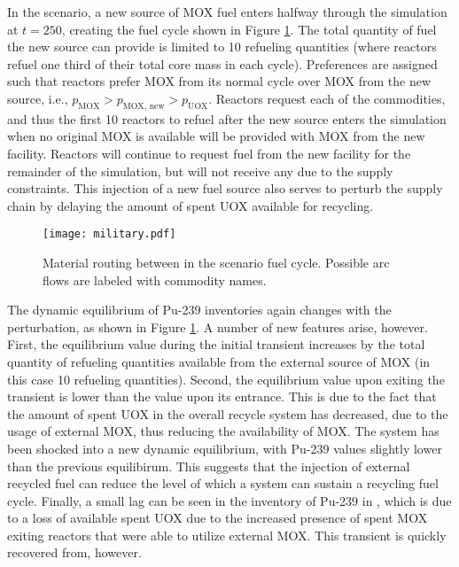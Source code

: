 In the \external scenario, a new source of MOX fuel enters halfway
through the simulation at $t = 250$, creating the fuel cycle shown in Figure
\ref{fig:military}. The total quantity of fuel the new source can provide is
limited to 10 refueling quantities (where reactors refuel one third of their
total core mass in each cycle). Preferences are assigned such that reactors
prefer MOX from its normal cycle over MOX from the new source, i.e.,
$p_{\text{MOX}} > p_{\text{MOX, new}} > p_{\text{UOX}}$. Reactors request each
of the commodities, and thus the first 10 reactors to refuel after the new
source enters the simulation when no original MOX is available will be provided
with MOX from the new facility. Reactors will continue to request fuel from the
new facility for the remainder of the simulation, but will not receive any due
to the supply constraints. This injection of a new fuel source also serves to
perturb the supply chain by delaying the amount of spent UOX available for
recycling.

\begin{figure}
  \begin{center}
    \texttt{[image: military.pdf]}
    \caption[]{
      \label{fig:military}
      Material routing between in the \external scenario fuel
      cycle. Possible arc flows are labeled with commodity names.}
  \end{center}
\end{figure}

The dynamic equilibrium of Pu-239 inventories again changes with the \external
perturbation, as shown in Figure \ref{fig:military}. A number of new features
arise, however. First, the equilibrium value during the initial transient
increases by the total quantity of refueling quantities available from the
external source of MOX (in this case 10 refueling quantities). Second, the
equilibrium value upon exiting the transient is lower than the value upon its
entrance. This is due to the fact that the amount of spent UOX in the overall
recycle system has decreased, due to the usage of external MOX, thus reducing
the availability of MOX. The system has been shocked into a new dynamic
equilibrium, with Pu-239 values slightly lower than the previous
equilibirum. This suggests that the injection of external recycled fuel can
reduce the level of which a system can sustain a recycling fuel cycle. Finally,
a small lag can be seen in the inventory of Pu-239 in \fabrication, which is due
to a loss of available spent UOX due to the increased presence of spent MOX
exiting reactors that were able to utilize external MOX. This transient is
quickly recovered from, however.


